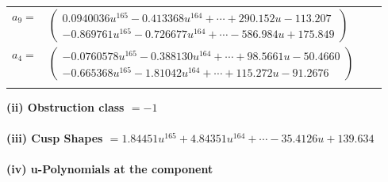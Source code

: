\documentclass[1p]{elsarticle_modified}
\theoremstyle{definition}
\begin{document}
\begin{tabular}{m{7pt} m{180pt} m{7pt} m{180pt} }
\flushright $a_{9}=$&$\begin{pmatrix}0.0940036 u^{165}-0.413368 u^{164}+\cdots+290.152 u-113.207\\-0.869761 u^{165}-0.726677 u^{164}+\cdots-586.984 u+175.849\end{pmatrix}$ \\
\flushright $a_{4}=$&$\begin{pmatrix}-0.0760578 u^{165}-0.388130 u^{164}+\cdots+98.5661 u-50.4660\\-0.665368 u^{165}-1.81042 u^{164}+\cdots+115.272 u-91.2676\end{pmatrix}$\\&\end{tabular}
\flushleft \textbf{(ii) Obstruction class $= -1$}\\~\\
\flushleft \textbf{(iii) Cusp Shapes $= 1.84451 u^{165}+4.84351 u^{164}+\cdots-35.4126 u+139.634$}\\~\\
\newpage\renewcommand{\arraystretch}{1}
\flushleft \textbf{(iv) u-Polynomials at the component}\newline \\
\end{document}

